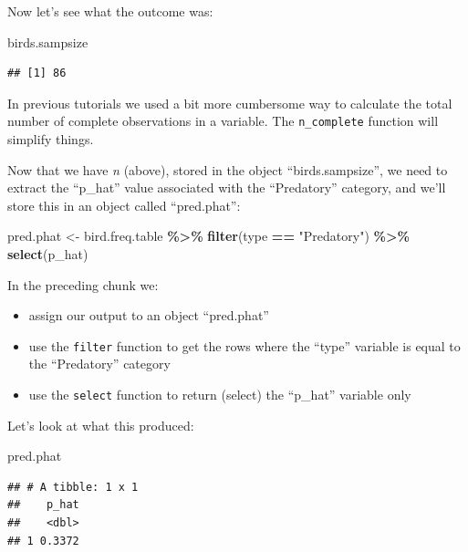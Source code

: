 \documentclass[
]{book}
\newenvironment{Shaded}{\begin{snugshade}}{\end{snugshade}}
\newcommand{\FunctionTok}[1]{\textcolor[rgb]{0.13,0.29,0.53}{\textbf{#1}}}
\newcommand{\NormalTok}[1]{#1}
\newcommand{\OtherTok}[1]{\textcolor[rgb]{0.56,0.35,0.01}{#1}}
\newcommand{\SpecialCharTok}[1]{\textcolor[rgb]{0.81,0.36,0.00}{\textbf{#1}}}
\newcommand{\StringTok}[1]{\textcolor[rgb]{0.31,0.60,0.02}{#1}}
\providecommand{\tightlist}{%
  \setlength{\itemsep}{0pt}\setlength{\parskip}{0pt}}
\begin{document}
Now let's see what the outcome was:

\begin{Shaded}
\begin{Highlighting}[]
\NormalTok{birds.sampsize}
\end{Highlighting}
\end{Shaded}

\begin{verbatim}
## [1] 86
\end{verbatim}

In previous tutorials we used a bit more cumbersome way to calculate the total number of complete observations in a variable. The \texttt{n\_complete} function will simplify things.

Now that we have \emph{n} (above), stored in the object ``birds.sampsize'', we need to extract the ``p\_hat'' value associated with the ``Predatory'' category, and we'll store this in an object called ``pred.phat'':

\begin{Shaded}
\begin{Highlighting}[]
\NormalTok{pred.phat }\OtherTok{\textless{}{-}}\NormalTok{ bird.freq.table }\SpecialCharTok{\%\textgreater{}\%}
  \FunctionTok{filter}\NormalTok{(type }\SpecialCharTok{==} \StringTok{"Predatory"}\NormalTok{) }\SpecialCharTok{\%\textgreater{}\%}
  \FunctionTok{select}\NormalTok{(p\_hat)}
\end{Highlighting}
\end{Shaded}

In the preceding chunk we:

\begin{itemize}
\tightlist
\item
  assign our output to an object ``pred.phat''
\item
  use the \texttt{filter} function to get the rows where the ``type'' variable is equal to the ``Predatory'' category
\item
  use the \texttt{select} function to return (select) the ``p\_hat'' variable only
\end{itemize}

Let's look at what this produced:

\begin{Shaded}
\begin{Highlighting}[]
\NormalTok{pred.phat}
\end{Highlighting}
\end{Shaded}

\begin{verbatim}
## # A tibble: 1 x 1
##    p_hat
##    <dbl>
## 1 0.3372
\end{verbatim}
\end{document}
